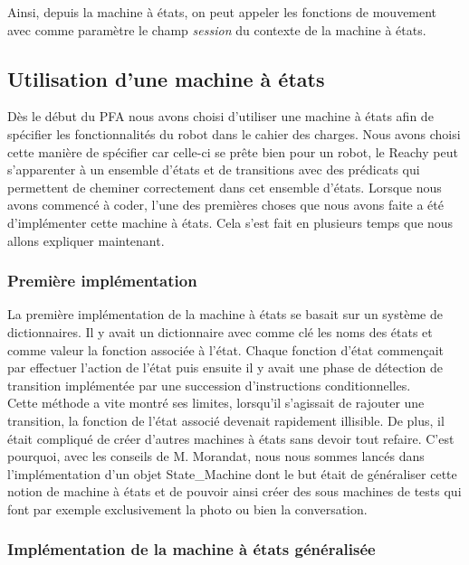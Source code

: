 \documentclass[a4paper,french]{article}
\begin{document}
Ainsi, depuis la machine à états, on peut appeler les fonctions de mouvement avec comme paramètre le champ \textit{session} du contexte de la machine à états.

\subsection{Utilisation d'une machine à états}
\label{section_machine_etat}
Dès le début du PFA nous avons choisi d'utiliser une machine à états afin de spécifier les fonctionnalités du robot dans le cahier des charges. Nous avons choisi cette manière de spécifier car celle-ci se prête bien pour un robot, le Reachy peut s'apparenter à un ensemble d'états et de transitions avec des prédicats qui permettent de cheminer correctement dans cet ensemble d'états. Lorsque nous avons commencé à coder, l'une des premières choses que nous avons faite a été d'implémenter cette machine à états. Cela s'est fait en plusieurs temps que nous allons expliquer maintenant.

\subsubsection{Première implémentation}

La première implémentation de la machine à états se basait sur un système de dictionnaires. Il y avait un dictionnaire avec comme clé les noms des états et comme valeur la fonction associée à l'état. Chaque fonction d'état commençait par effectuer l'action de l'état puis ensuite il y avait une phase de détection de transition implémentée par une succession d'instructions conditionnelles. \\ 

Cette méthode a vite montré ses limites, lorsqu'il s'agissait de rajouter une transition, la fonction de l'état associé devenait rapidement illisible. De plus, il était compliqué de créer d'autres machines à états sans devoir tout refaire. C'est pourquoi, avec les conseils de M. Morandat, nous nous sommes lancés dans l'implémentation d'un objet State\_Machine dont le but était de généraliser cette notion de machine à états et de pouvoir ainsi créer des sous machines de tests qui font par exemple exclusivement la photo ou bien la conversation. 

\subsubsection{Implémentation de la machine à états généralisée} \label{subsubsec:StMaGeneral}
\end{document}
